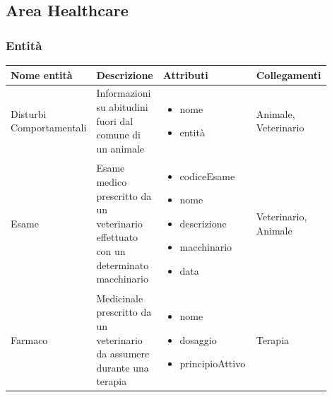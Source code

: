 \documentclass[12pt,a4paper]{article}
\begin{document}
\subsection{Area Healthcare}
\subsubsection{Entità}
\label{Healthcare Entita}
\begin{center}
\setlength{\extrarowheight}{1.5pt}
\begin{longtable}{|p{0.14\linewidth}|p{0.20\linewidth}|p{0.36\linewidth}|p{0.20\linewidth}|}
\hline 
\textbf{Nome entità} 	& \textbf{Descrizione} & \textbf{Attributi} & \textbf{Collegamenti}\\ 

    
\hline

Disturbi Comportamentali				 	&  Informazioni su abitudini fuori dal comune di un animale 
					& \begin{itemize}
						\setlength{\itemindent}{-1em}
						\vspace{-15pt}
						\setlength\itemsep{-0.25em}
						\item nome
						\item entità
					\end{itemize}
					&  Animale, Veterinario  \\ 

\hline
Esame				 	&  Esame medico prescritto da un veterinario effettuato con un determinato macchinario 
					& \begin{itemize}
						\setlength{\itemindent}{-1em}
						\vspace{-25pt}
						\setlength\itemsep{-0.25em}
						\item codiceEsame
						\item nome
						\item descrizione
						\item macchinario
						\item data
						
					\end{itemize}
					&  Veterinario, Animale  \\ 

\hline
Farmaco				 	&  Medicinale prescritto da un veterinario da assumere durante una terapia 
					& \begin{itemize}
						\setlength{\itemindent}{-1em}
						\vspace{-25pt}
						\setlength\itemsep{-0.25em}
						\item nome
						\item dosaggio
						\item principioAttivo
					\end{itemize}
					&  Terapia  \\ 


\end{longtable}
\end{center}
\end{document}
